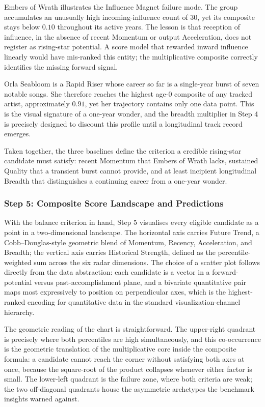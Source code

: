 \documentclass[journal]{vgtc}                     %
\begin{document}
Embers of Wrath illustrates the Influence Magnet failure mode. The group accumulates an unusually high incoming-influence count of $30$, yet its composite stays below $0.10$ throughout its active years. The lesson is that reception of influence, in the absence of recent Momentum or output Acceleration, does not register as rising-star potential. A score model that rewarded inward influence linearly would have mis-ranked this entity; the multiplicative composite correctly identifies the missing forward signal.

Orla Seabloom is a Rapid Riser whose career so far is a single-year burst of seven notable songs. She therefore reaches the highest age-$0$ composite of any tracked artist, approximately $0.91$, yet her trajectory contains only one data point. This is the visual signature of a one-year wonder, and the breadth multiplier in Step 4 is precisely designed to discount this profile until a longitudinal track record emerges.

Taken together, the three baselines define the criterion a credible rising-star candidate must satisfy: recent Momentum that Embers of Wrath lacks, sustained Quality that a transient burst cannot provide, and at least incipient longitudinal Breadth that distinguishes a continuing career from a one-year wonder.

\subsubsection{Step 5: Composite Score Landscape and Predictions}
\label{sec:step5_landscape}
With the balance criterion in hand, Step 5 visualises every eligible candidate as a point in a two-dimensional landscape. The horizontal axis carries Future Trend, a Cobb--Douglas-style geometric blend of Momentum, Recency, Acceleration, and Breadth; the vertical axis carries Historical Strength, defined as the percentile-weighted sum across the six radar dimensions. The choice of a scatter plot follows directly from the data abstraction: each candidate is a vector in a forward-potential versus past-accomplishment plane, and a bivariate quantitative pair maps most expressively to position on perpendicular axes, which is the highest-ranked encoding for quantitative data in the standard visualization-channel hierarchy.

The geometric reading of the chart is straightforward. The upper-right quadrant is precisely where both percentiles are high simultaneously, and this co-occurrence is the geometric translation of the multiplicative core inside the composite formula: a candidate cannot reach the corner without satisfying both axes at once, because the square-root of the product collapses whenever either factor is small. The lower-left quadrant is the failure zone, where both criteria are weak; the two off-diagonal quadrants house the asymmetric archetypes the benchmark insights warned against.
\end{document}
